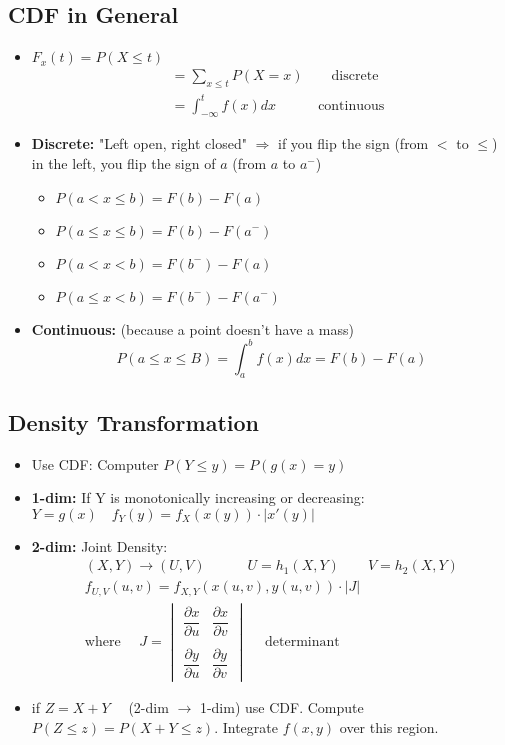 \subsection*{CDF in General}
\begin{itemize}
	\item $F_x(t) = P(X \leq t)$
	\begin{align*}
		& = \sum\limits_{x \leq t} P(X = x) \quad \quad \text{discrete}\\
		& = \int_{-\infty}^{t} f(x) dx \quad \quad \quad \text{continuous}
	\end{align*}
	\item \textbf{Discrete: } "Left open, right closed" $\Rightarrow$ if you flip the sign (from $<$ to $\leq$) in the left, you flip the sign of $a$ (from $a$ to $a^-$)
	\begin{itemize}[label={--}]
		\item $P(a < x \leq b) = F(b) - F(a)$
		\item $P(a \leq x \leq b) = F(b) - F(a^-)$
		\item $P(a < x < b) = F(b^-) - F(a)$
		\item $P(a \leq x < b) = F(b^-) - F(a^-)$
	\end{itemize}
	\item \textbf{Continuous: } (because a point doesn't have a mass)
	\begin{equation*}
		P(a \leq x \leq B) = \int_a^b f(x) dx = F(b) - F(a)
	\end{equation*}
\end{itemize}
\subsection*{Density Transformation}
\begin{itemize}
	\item Use CDF: Computer $P(Y \leq y) = P(g(x) = y)$
	\item \textbf{1-dim: } If Y is monotonically increasing or decreasing: $Y = g(x) \quad \boxed{f_Y(y) = f_X(x(y)) \cdot |x'(y)|}$
	\item \textbf{2-dim: } Joint Density:
	\begin{gather*}
		(X, Y) \rightarrow (U, V) \quad \quad \quad U = h_1(X, Y) \quad \quad V = h_2(X,Y)\\
		f_{U,V}(u,v) = f_{X,Y}(x(u,v), y(u,v)) \cdot |J|\\
		\text{where } \quad J = \begin{vmatrix}
			\dfrac{\partial x}{\partial u} & \dfrac{\partial x}{\partial v}\\\\
			\dfrac{\partial y}{\partial u} & \dfrac{\partial y}{\partial v}
		\end{vmatrix} \quad \text{ determinant}
	\end{gather*}
	\item if $Z = X + Y\quad$ (2-dim $\rightarrow$ 1-dim) use CDF. Compute $P(Z \leq z) = P(X+Y \leq z)$. Integrate $f(x,y)$ over this region.
\end{itemize}
